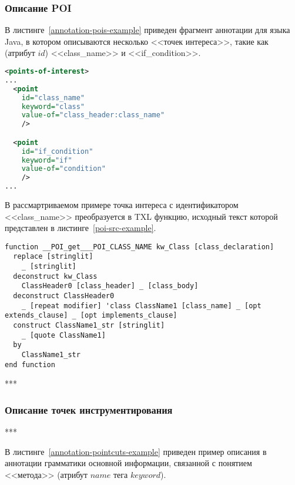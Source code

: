 \subsubsection{Описание POI}

В листинге~\ref{annotation-pois-example} приведен фрагмент аннотации для языка Java, в котором описываются несколько <<точек интереса>>, такие как (атрибут $id$) <<class\_name>> и <<if\_condition>>.

\begin{lstlisting}[frame=single, language=XML, label={annotation-pois-example}, caption={Пример описания <<точек интереса>>.}]
<points-of-interest>
...
  <point
    id="class_name"
    keyword="class"
    value-of="class_header:class_name"
    />

  <point
    id="if_condition"
    keyword="if"
    value-of="condition"
    />
...
\end{lstlisting}

В рассмартриваемом примере точка интереса с идентификатором <<class\_name>> преобразуется в TXL функцию, исходный текст которой представлен в листинге~\ref{poi-src-example}.

\begin{lstlisting}[frame=single, language=TXL, label={poi-src-example}, caption={Пример синтезированной функции для точки интереса <<class\_name>>.}]
function __POI_get___POI_CLASS_NAME kw_Class [class_declaration]
  replace [stringlit]
    _ [stringlit]
  deconstruct kw_Class
    ClassHeader0 [class_header] _ [class_body]
  deconstruct ClassHeader0
    _ [repeat modifier] 'class ClassName1 [class_name] _ [opt extends_clause] _ [opt implements_clause]
  construct ClassName1_str [stringlit]
    _ [quote ClassName1]
  by
    ClassName1_str
end function
\end{lstlisting}

***

\subsubsection{Описание точек инструментирования}

***

В листинге~\ref{annotation-pointcuts-example} приведен пример описания в аннотации грамматики основной информации, связанной с понятием <<метода>> (атрибут $name$ тега $keyword$).

